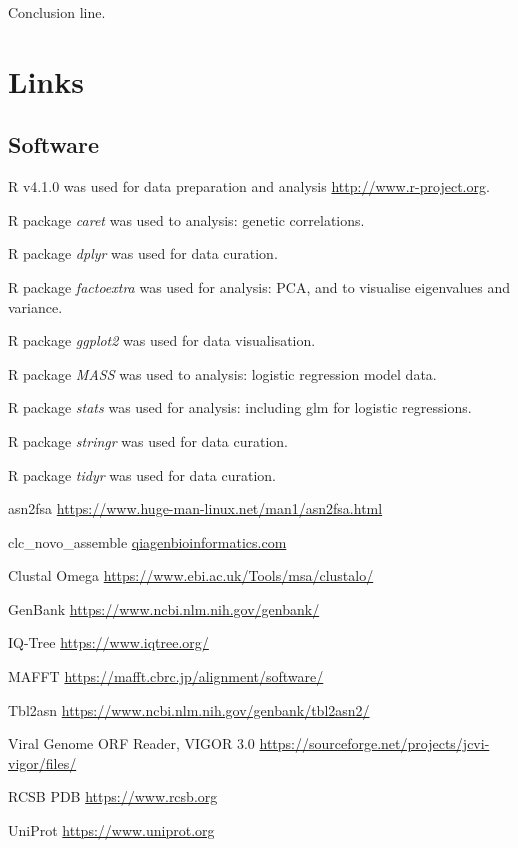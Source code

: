 \documentclass{article}
\begin{document}
Conclusion line.

\section{Links}
\subsection{Software}
\begin{description}[noitemsep]

\item R v4.1.0 was used for data preparation and analysis \url{http://www.r-project.org}.
\item R package \textit{caret} was used to analysis: genetic correlations.
\item R package \textit{dplyr} was used for data curation.
\item R package \textit{factoextra} was used for analysis: PCA, and to visualise eigenvalues and variance.
\item R package \textit{ggplot2} was used for data visualisation.
\item R package \textit{MASS} was used to analysis: logistic regression model data.
\item R package \textit{stats} was used for analysis: including glm for logistic regressions. 
\item R package \textit{stringr} was used for data curation.
\item R package \textit{tidyr} was used for data curation.
\item asn2fsa \url{https://www.huge-man-linux.net/man1/asn2fsa.html}
\item clc\_novo\_assemble \href{https://resources.qiagenbioinformatics.com/manuals
/clcgenomicsworkbench/852/index.php?manual=De_novo_assembly.html}{qiagenbioinformatics.com} \
\item Clustal Omega \url{https://www.ebi.ac.uk/Tools/msa/clustalo/}
\item GenBank \url{https://www.ncbi.nlm.nih.gov/genbank/}
\item IQ-Tree \url{https://www.iqtree.org/}
\item MAFFT \url{https://mafft.cbrc.jp/alignment/software/} \cite{katoh2013mafft}
\item Tbl2asn \url{https://www.ncbi.nlm.nih.gov/genbank/tbl2asn2/}
\item Viral Genome ORF Reader, VIGOR 3.0 \url{https://sourceforge.net/projects/jcvi-vigor/files/}
\item RCSB PDB	\url{https://www.rcsb.org}
\item UniProt	\url{https://www.uniprot.org}

\end{description}
\end{document}
